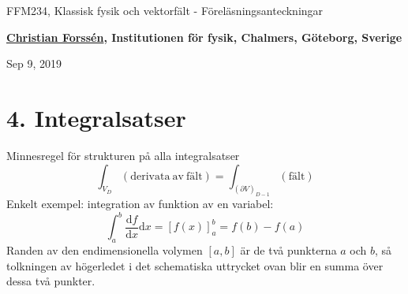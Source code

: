 \documentclass[%
oneside,                 %
final,                   %
10pt]{article}
\begin{document}

\newcommand{\exercisesection}[1]{\subsection*{#1}}







\thispagestyle{empty}

\begin{center}
{\LARGE\bf
\begin{spacing}{1.25}
FFM234, Klassisk fysik och vektorfält - Föreläsningsanteckningar
\end{spacing}
}
\end{center}


\begin{center}
{\bf \href{{http://fy.chalmers.se/subatom/tsp/}}{Christian Forssén}, Institutionen för fysik, Chalmers, Göteborg, Sverige${}^{}$} \\ [0mm]
\end{center}

\begin{center}
\end{center}
    

\begin{center}
Sep 9, 2019
\end{center}

\vspace{1cm}


\section*{4. Integralsatser}

Minnesregel för strukturen på alla integralsatser
\begin{equation}
  \int_{V_D} (\mathrm{derivata~av~fält}) = \int_{(\partial V)_{D-1}} (\mathrm{fält})
\end{equation}
Enkelt exempel: integration av funktion av en variabel:
\begin{equation}
\int_a^b \frac{\mbox{d}f}{\mbox{d}x} \mbox{d}x = \left[ f(x) \right]_a^b = f(b)-f(a)
\end{equation}
Randen av den endimensionella volymen $[a,b]$ är de två punkterna $a$ och $b$, så tolkningen av högerledet i det schematiska uttrycket ovan blir en summa över dessa två punkter.
\end{document}

